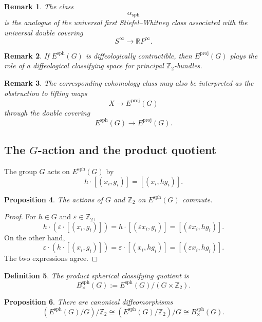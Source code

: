 \documentclass[11pt]{amsart}
\newtheorem{definition}{Definition}[section]
\newtheorem{proposition}[definition]{Proposition}
\newtheorem{remark}[definition]{Remark}
\begin{document}
\begin{remark}
The class
\[
\alpha_{\mathrm{sph}}
\]
is the analogue of the universal first Stiefel--Whitney class associated with
the universal double covering
\[
S^\infty\to\mathbb RP^\infty.
\]
\end{remark}

\begin{remark}
If \(E^{\mathrm{sph}}(G)\) is diffeologically contractible, then
\(E^{\mathrm{proj}}(G)\) plays the role of a diffeological classifying space
for principal \(\mathbb Z_2\)-bundles.
\end{remark}

\begin{remark}
The corresponding cohomology class may also be interpreted as the obstruction
to lifting maps
\[
X\to E^{\mathrm{proj}}(G)
\]
through the double covering
\[
E^{\mathrm{sph}}(G)\to E^{\mathrm{proj}}(G).
\]
\end{remark}

\subsection{The \(G\)-action and the product quotient}

The group \(G\) acts on \(E^{\mathrm{sph}}(G)\) by
\[
h\cdot [(x_i,g_i)]
=
[(x_i,hg_i)].
\]

\begin{proposition}
The actions of \(G\) and \(\mathbb Z_2\) on \(E^{\mathrm{sph}}(G)\) commute.
\end{proposition}

\begin{proof}
For \(h\in G\) and \(\varepsilon\in\mathbb Z_2\),
\[
h\cdot(\varepsilon\cdot[(x_i,g_i)])
=
h\cdot[(\varepsilon x_i,g_i)]
=
[(\varepsilon x_i,hg_i)].
\]
On the other hand,
\[
\varepsilon\cdot(h\cdot[(x_i,g_i)])
=
\varepsilon\cdot[(x_i,hg_i)]
=
[(\varepsilon x_i,hg_i)].
\]
The two expressions agree.
\end{proof}

\begin{definition}
The product spherical classifying quotient is
\[
B^{\mathrm{sph}}_{\times}(G)
:=
E^{\mathrm{sph}}(G)/(G\times \mathbb Z_2).
\]
\end{definition}

\begin{proposition}
There are canonical diffeomorphisms
\[
(E^{\mathrm{sph}}(G)/G)/\mathbb Z_2
\cong
(E^{\mathrm{sph}}(G)/\mathbb Z_2)/G
\cong
B^{\mathrm{sph}}_{\times}(G).
\]
\end{proposition}
\end{document}
